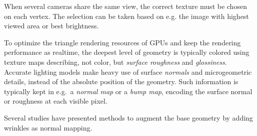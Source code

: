 When several cameras share the same view, the correct texture must be chosen on each vertex.
The selection can be taken based on e.g. the image with highest viewed area or best brightness.


To optimize the triangle rendering resources of GPUs and keep the rendering performance as realtime, the deepest level of geometry is typically colored using texture maps describing, not color, but \emph{surface roughness} and \emph{glossiness}.
Accurate lighting models make heavy use of surface \emph{normals} and microgeometric details, instead of the absolute position of the geometry.
Such information is typically kept in e.g.\ a \emph{normal map} or a \emph{bump map}, encoding the surface normal or roughness at each visible pixel.

Several studies have presented methods to augment the base geometry by adding wrinkles as normal mapping. \cite{bickel2007multi}




%
%
%
%
%

